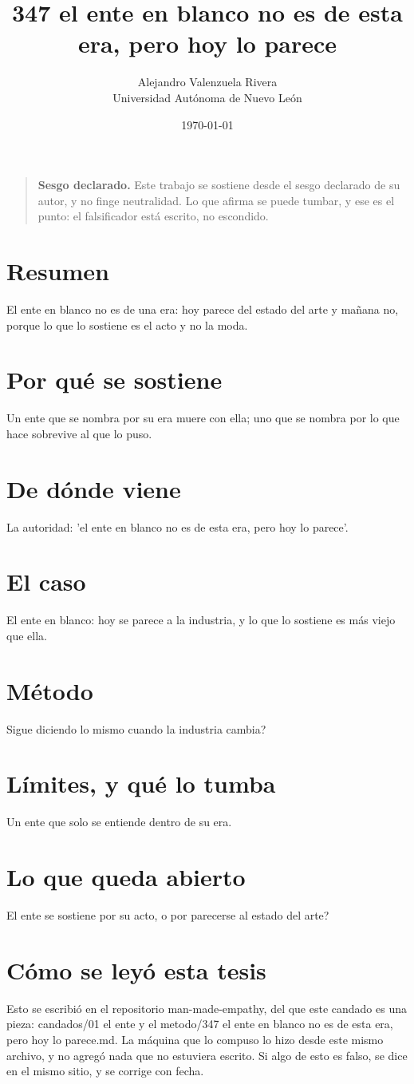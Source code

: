 \documentclass[11pt,a4paper]{article}
\title{347 el ente en blanco no es de esta era, pero hoy lo parece}
\author{Alejandro Valenzuela Rivera\\\small Universidad Autónoma de Nuevo León}
\date{\today}
\begin{document}
\maketitle

\begin{quote}
\textbf{Sesgo declarado.} Este trabajo se sostiene desde el sesgo declarado de su autor, y no finge neutralidad. Lo que afirma se puede tumbar, y ese es el punto: el falsificador está escrito, no escondido.
\end{quote}

\section*{Resumen}
El ente en blanco no es de una era: hoy parece del estado del arte y mañana no, porque lo que lo sostiene es el acto y no la moda.

\section{Por qué se sostiene}
Un ente que se nombra por su era muere con ella; uno que se nombra por lo que hace sobrevive al que lo puso.

\section{De dónde viene}
La autoridad: 'el ente en blanco no es de esta era, pero hoy lo parece'.

\section{El caso}
El ente en blanco: hoy se parece a la industria, y lo que lo sostiene es más viejo que ella.

\section{Método}
\textquestiondown{}Sigue diciendo lo mismo cuando la industria cambia?

\section{Límites, y qué lo tumba}
Un ente que solo se entiende dentro de su era.

\section{Lo que queda abierto}
\textquestiondown{}El ente se sostiene por su acto, o por parecerse al estado del arte?

\section*{Cómo se leyó esta tesis}
Esto se escribió en el repositorio man-made-empathy, del que este candado es una pieza: candados/01 el ente y el metodo/347 el ente en blanco no es de esta era, pero hoy lo parece.md. La máquina que lo compuso lo hizo desde este mismo archivo, y no agregó nada que no estuviera escrito. Si algo de esto es falso, se dice en el mismo sitio, y se corrige con fecha.
\end{document}
